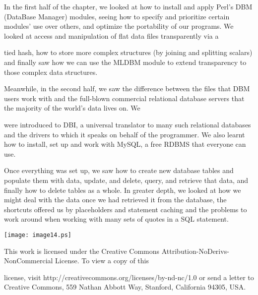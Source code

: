 \documentclass[a4paper,11pt]{book}
\begin{document}
\noindent In the first half of the chapter, we looked at how to install and apply Perl's DBM (DataBase Manager) modules, seeing how to specify and prioritize certain modules' use over others, and optimize the portability of our programs. We looked at access and manipulation of flat data files transparently via a

\noindent tied hash, how to store more complex structures (by joining and splitting scalars) and finally saw how we can use the MLDBM module to extend transparency to those complex data structures.

\noindent 

\noindent Meanwhile, in the second half, we saw the difference between the files that DBM users work with and the full-blown commercial relational database servers that the majority of the world's data lives on. We

\noindent were introduced to DBI, a universal translator to many such relational databases and the drivers to which it speaks on behalf of the programmer. We also learnt how to install, set up and work with MySQL, a free RDBMS that everyone can use.

\noindent 

\noindent Once everything was set up, we saw how to create new database tables and populate them with data, update, and delete, query, and retrieve that data, and finally how to delete tables as a whole. In greater depth, we looked at how we might deal with the data once we had retrieved it from the database, the shortcuts offered us by placeholders and statement caching and the problems to work around when working with many sets of quotes in a SQL statement.

\noindent  

\noindent  

\noindent  

\noindent  

\noindent 

\noindent \texttt{[image: image14.ps]}

\noindent 

\noindent This work is licensed under the Creative Commons Attribution-NoDerivs-NonCommercial License. To view a copy of this

\noindent license, visit http://creativecommons.org/licenses/by-nd-nc/1.0 or send a letter to Creative Commons, 559 Nathan Abbott Way, Stanford, California 94305, USA.
\end{document}
